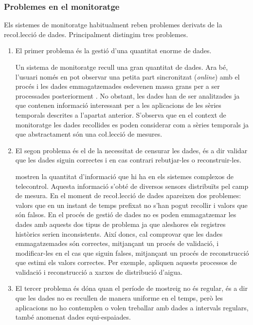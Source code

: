 \subsubsection{Problemes en el monitoratge}

Els sistemes de monitoratge habitualment reben problemes derivats de la reco\l.lecció de dades. Principalment distingim tres problemes.

\begin{enumerate}
\item El primer problema és la gestió d'una quantitat enorme de dades. 

Un sistema de monitoratge recull una gran quantitat de dades. Ara bé, l'usuari només en pot observar una petita part sincronitzat (\emph{online}) amb el procés i les dades emmagatzemades esdevenen massa grans per a ser processades posteriorment \parencite{keogh97}. No obstant, les dades han de ser analitzades ja que contenen informació interessant per a les aplicacions de les sèries temporals descrites a l'apartat anterior. S'observa que en el context de monitoratge les dades recollides es poden considerar com a sèries temporals ja que abstractament són una co\l.lecció de mesures.


\item El segon problema és el de la necessitat de censurar les dades, és a dir validar que les dades siguin correctes i en cas contrari rebutjar-les o reconstruir-les. 

\textcite{quevedo10} mostren la quantitat d'informació que hi ha en els sistemes complexos de telecontrol. Aquesta informació s'obté de diversos sensors distribuïts pel camp de mesura.
En el moment de reco\l.lecció de dades apareixen dos problemes: valors que en un instant de temps prefixat no s'han pogut recollir i valors que són falsos. En el procés de gestió de dades no es poden emmagatzemar les dades amb aquests dos tipus de problema ja que aleshores els registres històrics serien inconsistents. 
Així doncs, cal comprovar que les dades emmagatzemades són correctes, mitjançant un procés de validació, i modificar-les en el cas que siguin falses, mitjançant un procés de reconstrucció que estimi els valors correctes. Per exemple, \citeauthor{quevedo10} apliquen aquests processos de validació i reconstrucció a xarxes de distribució d'aigua.


\item El tercer problema és dóna quan el període de mostreig no és regular, és a dir que les dades no es recullen de manera uniforme en el temps, però les aplicacions no ho contemplen o volen treballar amb dades a intervals regulars, també anomenat dades equi-espaiades.


\end{enumerate}
